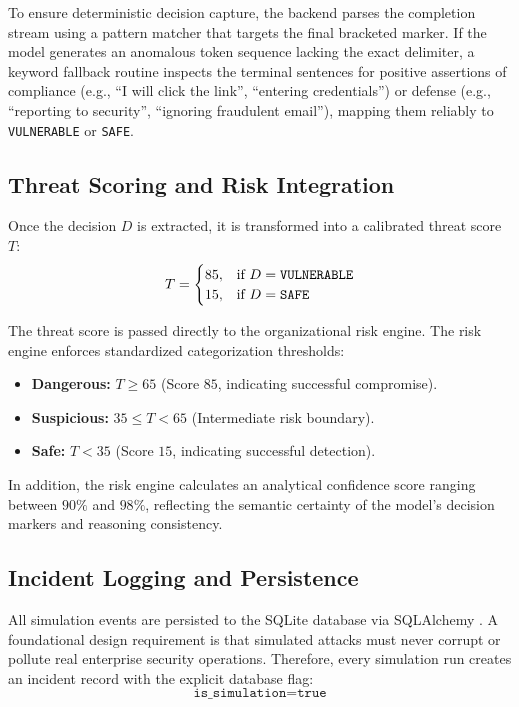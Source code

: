 \documentclass[conference,letterpaper]{IEEEtran}
\begin{document}
To ensure deterministic decision capture, the backend parses the completion stream using a pattern matcher that targets the final bracketed marker. If the model generates an anomalous token sequence lacking the exact delimiter, a keyword fallback routine inspects the terminal sentences for positive assertions of compliance (e.g., ``I will click the link'', ``entering credentials'') or defense (e.g., ``reporting to security'', ``ignoring fraudulent email''), mapping them reliably to \texttt{VULNERABLE} or \texttt{SAFE}.

\subsection{Threat Scoring and Risk Integration}
Once the decision $D$ is extracted, it is transformed into a calibrated threat score $T$:
\begin{equation}
T = \begin{cases} 
85, & \text{if } D = \text{\texttt{VULNERABLE}} \\
15, & \text{if } D = \text{\texttt{SAFE}}
\end{cases}
\end{equation}

The threat score is passed directly to the organizational risk engine. The risk engine enforces standardized categorization thresholds:
\begin{itemize}
    \item \textbf{Dangerous:} $T \ge 65$ (Score $85$, indicating successful compromise).
    \item \textbf{Suspicious:} $35 \le T < 65$ (Intermediate risk boundary).
    \item \textbf{Safe:} $T < 35$ (Score $15$, indicating successful detection).
\end{itemize}

In addition, the risk engine calculates an analytical confidence score ranging between $90\%$ and $98\%$, reflecting the semantic certainty of the model's decision markers and reasoning consistency.

\subsection{Incident Logging and Persistence}
All simulation events are persisted to the SQLite database via SQLAlchemy \cite{sqlalchemy2024}. A foundational design requirement is that simulated attacks must never corrupt or pollute real enterprise security operations. Therefore, every simulation run creates an incident record with the explicit database flag:
\begin{equation}
\texttt{is\_simulation} = \texttt{true}
\end{equation}
\end{document}

